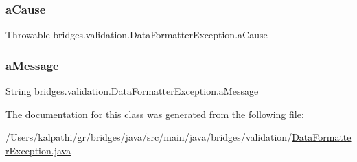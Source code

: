 \subsubsection{\texorpdfstring{aCause}{aCause}}
{\footnotesize\ttfamily Throwable bridges.\+validation.\+Data\+Formatter\+Exception.\+a\+Cause}

\mbox{\label{classbridges_1_1validation_1_1_data_formatter_exception_a8cab4688a8a80a0575bcda28e6ac7b8c}} 
\subsubsection{\texorpdfstring{aMessage}{aMessage}}
{\footnotesize\ttfamily String bridges.\+validation.\+Data\+Formatter\+Exception.\+a\+Message}



The documentation for this class was generated from the following file\+:\begin{DoxyCompactItemize}
\item 
/\+Users/kalpathi/gr/bridges/java/src/main/java/bridges/validation/\mbox{\hyperlink{_data_formatter_exception_8java}{Data\+Formatter\+Exception.\+java}}\end{DoxyCompactItemize}
